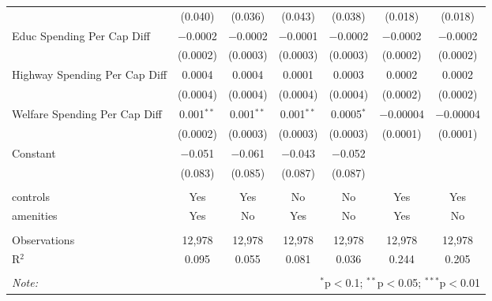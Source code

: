 \begin{table}[!htbp]
\begin{tabular}{@{\extracolsep{5pt}}lcccccc}
  & (0.040) & (0.036) & (0.043) & (0.038) & (0.018) & (0.018) \\ 
  Educ Spending Per Cap Diff & $-$0.0002 & $-$0.0002 & $-$0.0001 & $-$0.0002 & $-$0.0002 & $-$0.0002 \\ 
  & (0.0002) & (0.0003) & (0.0003) & (0.0003) & (0.0002) & (0.0002) \\ 
  Highway Spending Per Cap Diff & 0.0004 & 0.0004 & 0.0001 & 0.0003 & 0.0002 & 0.0002 \\ 
  & (0.0004) & (0.0004) & (0.0004) & (0.0004) & (0.0002) & (0.0002) \\ 
  Welfare Spending Per Cap Diff & 0.001$^{**}$ & 0.001$^{**}$ & 0.001$^{**}$ & 0.0005$^{*}$ & $-$0.00004 & $-$0.00004 \\ 
  & (0.0002) & (0.0003) & (0.0003) & (0.0003) & (0.0001) & (0.0001) \\ 
  Constant & $-$0.051 & $-$0.061 & $-$0.043 & $-$0.052 &  &  \\ 
  & (0.083) & (0.085) & (0.087) & (0.087) &  &  \\ 
 \hline \\[-1.8ex] 
controls & Yes & Yes & No & No & Yes & Yes \\ 
amenities & Yes & No & Yes & No & Yes & No \\ 
\hline \\[-1.8ex] 
Observations & 12,978 & 12,978 & 12,978 & 12,978 & 12,978 & 12,978 \\ 
R$^{2}$ & 0.095 & 0.055 & 0.081 & 0.036 & 0.244 & 0.205 \\ 
\hline 
\hline \\[-1.8ex] 
\textit{Note:}  & \multicolumn{6}{r}{$^{*}$p$<$0.1; $^{**}$p$<$0.05; $^{***}$p$<$0.01} \\ 
\end{tabular} 
\end{table} 
